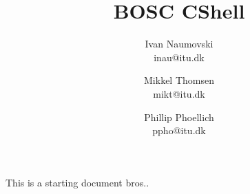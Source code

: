 \documentclass[pdftex,12pt,a4paper]{report}
\begin{document}
\title{BOSC CShell}
\date{}
\author{Ivan Naumovski\\ inau@itu.dk
        \and Mikkel Thomsen\\ mikt@itu.dk \and Phillip Phoellich\\ ppho@itu.dk}

\maketitle

\tableofcontents
This is a starting document bros..






\end{document}
